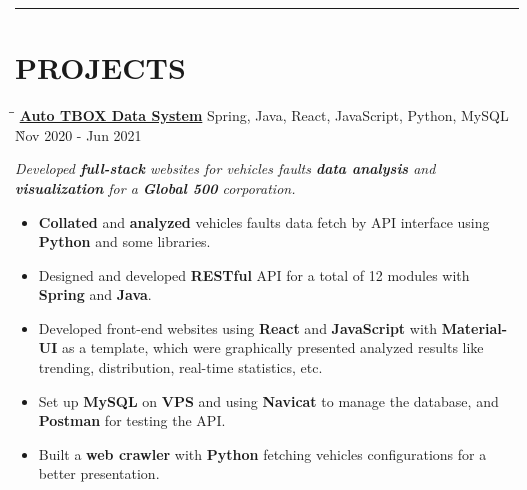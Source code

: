 \documentclass{res}
\begin{document}
\begin{resume}
\vspace{+0.05in}

\vspace{-12pt}
\hspace{-0.55in}
\noindent\rule[0.25\baselineskip]{19.36cm}{0.5pt}    
        
\vspace{-0.2in}
\section{PROJECTS}

    \vspace{-0.05in}	 
    \begin{tabbing}
    \hspace{2.391in}\= \hspace{3in}\= \kill %
    \href{https://github.com/DolorHunter/AutoTBOXDataSystem}{\bf Auto TBOX Data System}  \> 
                Spring, Java, React, JavaScript, Python, MySQL \` Nov 2020 - Jun 2021 \\
    \end{tabbing}\vspace{-20pt}      %
    \vspace{-0.13in}
    \textit{Developed {\bf full-stack} websites for vehicles faults {\bf data analysis} and
             {\bf visualization} for a {\bf Global 500} corporation.}
    \vspace{-0.1in}
    \begin{itemize} \itemsep 0.5pt %
        \item {\bf Collated} and {\bf analyzed} vehicles faults data fetch by API interface using 
                {\bf Python} and some libraries.
        \item Designed and developed {\bf RESTful} API for a total of 12 modules with 
                {\bf Spring} and {\bf Java}.
        \item Developed front-end websites using {\bf React} and {\bf JavaScript} with 
                {\bf Material-UI} as a template, which were graphically presented analyzed results 
                like trending, distribution, real-time statistics, etc.
        \item Set up {\bf MySQL} on {\bf VPS} and using {\bf Navicat} to manage the database, and 
                {\bf Postman} for testing the API.
        \item Built a {\bf web crawler} with {\bf Python} fetching vehicles configurations for 
                a better presentation.
    \end{itemize}


\end{resume}
\end{document}
